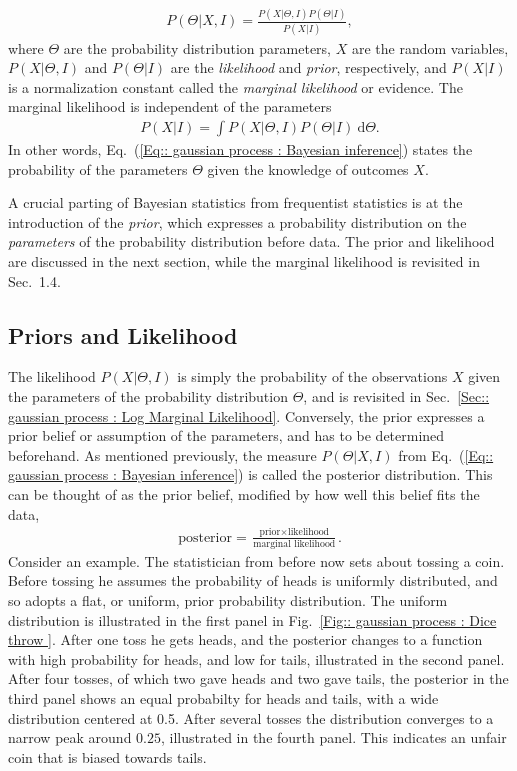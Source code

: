 \documentclass[twoside,english]{uiofysmaster}
\begin{document}
\begin{align}\label{Eq:: gaussian process : Bayesian inference}
P(\Theta | X , I) = \frac{P(X|\Theta, I) P(\Theta| I)}{P(X | I)},
\end{align}
where $\Theta$ are the probability distribution parameters, $X$ are the random variables, $P(X|\Theta, I)$  and $P(\Theta |I)$ are the \textit{likelihood} and \textit{prior}, respectively, and $P(X|I)$ is a normalization constant called the \textit{marginal likelihood} or evidence. The marginal likelihood is independent of the parameters
\begin{align}
P(X|I) = \int P(X| \Theta, I) P(\Theta | I)~ \text{d} \Theta.
\end{align}
In other words, Eq.~(\ref{Eq:: gaussian process : Bayesian inference}) states the probability of the parameters $\Theta$ given the knowledge of outcomes $X$.

A crucial parting of Bayesian statistics from frequentist statistics is at the introduction of the \textit{prior}, which expresses a probability distribution on the \textit{parameters} of the probability distribution before data. The prior and likelihood are discussed in the next section, while the marginal likelihood is revisited in Sec.~1.4.

\subsection{Priors and Likelihood}\label{Sec:: gaussian process : Priors and Likelihood}

The likelihood $P(X |\Theta, I)$ is simply the probability of the observations $X$ given the parameters of the probability distribution $\Theta$, and is revisited in Sec.~\ref{Sec:: gaussian process : Log Marginal Likelihood}. Conversely, the prior expresses a prior belief or assumption of the parameters, and has to be determined beforehand. As mentioned previously, the measure $P(\Theta | X , I)$ from Eq.~(\ref{Eq:: gaussian process : Bayesian inference}) is called the posterior distribution. This can be thought of as the prior belief, modified by how well this belief fits the data,
\begin{align*}
\text{posterior} = \frac{\text{prior} \times \text{likelihood}}{\text{marginal likelihood}}.
\end{align*}
Consider an example. The statistician from before now sets about tossing a coin. Before tossing he assumes the probability of heads is uniformly distributed, and so adopts a flat, or uniform, prior probability distribution. The uniform distribution is illustrated in the first panel in Fig.~\ref{Fig:: gaussian process : Dice throw }. After one toss he gets heads, and the posterior changes to a function with high probability for heads, and low for tails, illustrated in the second panel. After four tosses, of which two gave heads and two gave tails, the posterior in the third panel shows an equal probabilty for heads and tails, with a wide distribution centered at 0.5. After several tosses the distribution converges to a narrow peak around $0.25$, illustrated in the fourth panel. This indicates an unfair coin that is biased towards tails.
\end{document}
